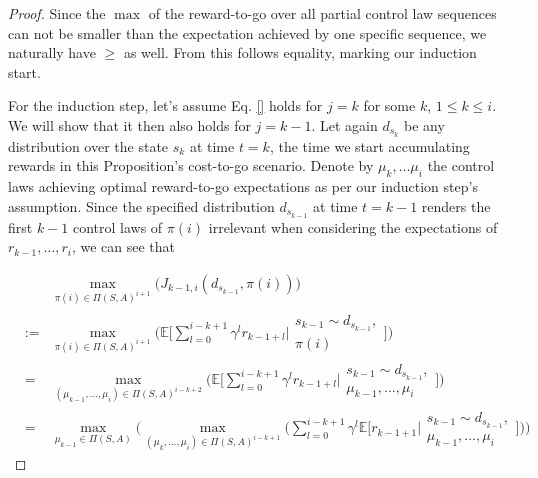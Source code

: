 \documentclass[11pt]{article} %
\begin{document}
\begin{proof}
Since the $\max$ of the reward-to-go over all partial control law sequences can not be smaller than the expectation achieved by one specific sequence, we naturally have $\ge$ as well. From this follows equality, marking our induction start. 

For the induction step, let's assume Eq. \ref{} holds for $j = k$ for some $k$, $1 \le k \le i$. We will show that it then also holds for $j = k - 1$. Let again $d_{s_k}$ be any distribution over the state $s_k$ at time $t = k$, the time we start accumulating rewards in this Proposition's cost-to-go scenario. Denote by $\mu_k,\dots \mu_i$ the control laws achieving optimal reward-to-go expectations as per our induction step's assumption. Since the specified distribution $d_{s_{k-1}}$ at time $t = k-1$ renders the first $k-1$ control laws of $\pi(i)$ irrelevant when considering the expectations of $r_{k-1},\dots,r_i$, we can see that


\begin{equation}
	\begin{array}{rcl}
			&	&	\max\limits_{\pi(i) \in \Pi(S,A)^{i+1}} \Big(J_{k-1,i}(d_{s_{k-1}},\pi(i)) \Big) \\
			
			& :=	&	\max\limits_{\pi(i) \in \Pi(S,A)^{i+1}} \Big( \mathbb{E} \Big[ \sum\limits_{l=0}^{i-k+1} \gamma^l r_{k-1+l} \Big| \begin{array}{c}
																																						s_{k-1} \sim d_{s_{k-1}}, \\
																																						\pi(i)
																																					\end{array} \Big] \Big) \\
			& =	&	\max\limits_{(\mu_{k-1},\dots,\mu_i) \in \Pi(S,A)^{i-k+2}} \Big( \mathbb{E} \Big[ \sum\limits_{l=0}^{i-k+1} \gamma^l r_{k-1+l} \Big| \begin{array}{c}
																																						s_{k-1} \sim d_{s_{k-1}}, \\
																																						\mu_{k-1},\dots,\mu_i
																																					\end{array} \Big] \Big) \\
			& = &	\max\limits_{\mu_{k-1} \in \Pi(S,A)} \Big( \max\limits_{(\mu_k,\dots,\mu_i) \in \Pi(S,A)^{i-k+1}} \Big( \sum\limits_{l=0}^{i-k+1} \gamma^l \mathbb{E}\Big[ r_{k-1+1} \Big| 	\begin{array}{c}
																																																s_{k-1} \sim d_{s_{k-1}}, \\
																																																\mu_{k-1},\dots,\mu_i
																																															\end{array} \Big] \Big) \Big)
	\end{array}
\end{equation}


\end{proof}
\end{document}
